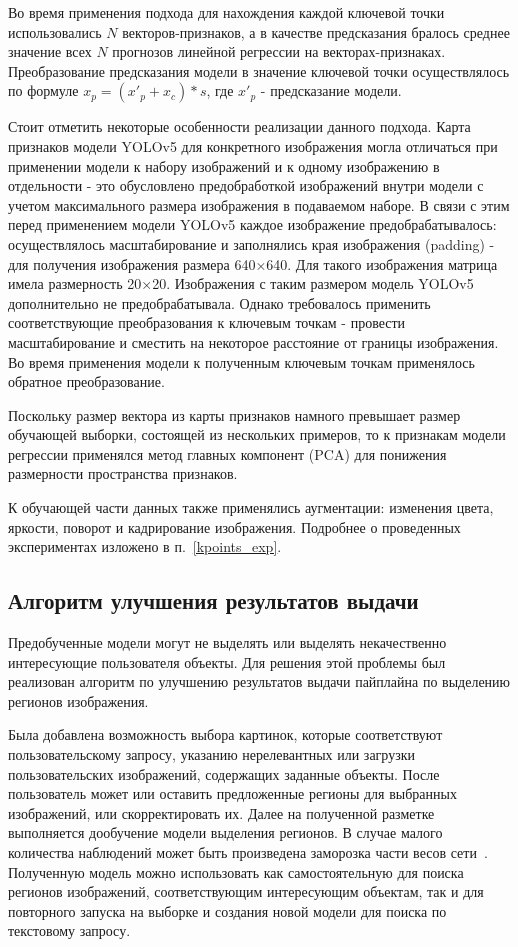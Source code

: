 \documentclass[a4paper,14pt]{article}
\begin{document}
	Во время применения подхода для нахождения каждой ключевой точки использовались $N$ векторов-признаков, а в качестве предсказания бралось среднее значение всех $N$ прогнозов линейной регрессии на векторах-признаках. 
	Преобразование предсказания модели в значение ключевой точки осуществлялось по формуле $x_p = (x'_p +  x_c) * s$, где $x'_p$ - предсказание модели.
    
    Стоит отметить некоторые особенности реализации данного подхода.
    Карта признаков модели YOLOv5 для конкретного изображения могла отличаться при применении модели к набору изображений и к одному изображению в отдельности - это обусловлено предобработкой изображений внутри модели с учетом максимального размера изображения в подаваемом наборе.
    В связи с этим перед применением модели YOLOv5 каждое изображение предобрабатывалось: осуществлялось масштабирование и заполнялись края изображения (padding) - для получения изображения размера 640×640.
    Для такого изображения матрица имела размерность 20×20.
    Изображения с таким размером модель YOLOv5 дополнительно не предобрабатывала.
    Однако требовалось применить соответствующие преобразования к ключевым точкам - провести масштабирование и сместить на некоторое расстояние от границы изображения.
    Во время применения модели к полученным ключевым точкам применялось обратное преобразование.
    
    Поскольку размер вектора из карты признаков намного превышает размер обучающей выборки, состоящей из нескольких примеров, то к признакам модели регрессии применялся метод главных компонент (PCA) для понижения размерности пространства признаков.
    
    К обучающей части данных также применялись аугментации: изменения цвета, яркости, поворот и кадрирование изображения. Подробнее о проведенных экспериментах изложено в п.~\ref{kpoints_exp}.
    
    \subsection{Алгоритм улучшения результатов выдачи}
    
    Предобученные модели могут не выделять или выделять некачественно интересующие пользователя объекты.
    Для решения этой проблемы был реализован алгоритм по улучшению результатов выдачи пайплайна по выделению регионов изображения.
    
    Была добавлена возможность выбора картинок, которые соответствуют пользовательскому запросу, указанию нерелевантных или загрузки пользовательских изображений, содержащих заданные объекты.
    После пользователь может или оставить предложенные регионы для выбранных изображений, или скорректировать их.
    Далее на полученной разметке выполняется дообучение модели выделения регионов.
    В случае малого количества наблюдений может быть произведена заморозка части весов сети~\cite{wang2020few}.
    Полученную модель можно использовать как самостоятельную для поиска регионов изображений, соответствующим интересующим объектам, так и для повторного запуска на выборке и создания новой модели для поиска по текстовому запросу.
    
\end{document}
